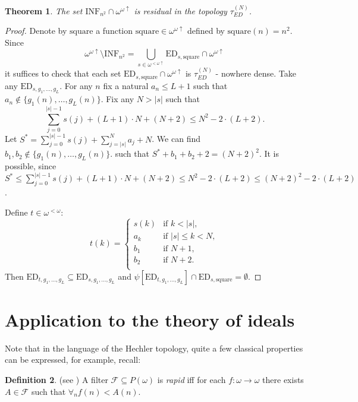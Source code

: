 \documentclass[12pt]{amsart}
\theoremstyle{plain}
\newtheorem{theorem}{Theorem}[section]
\theoremstyle{definition}
\newtheorem{definition}[theorem]{Definition}
\theoremstyle{remark}
\newcommand{\finbaire}{\omega^{<\omega}}
\newcommand{\finincrbaire}{\omega^{< \omega \uparrow}}
\newcommand{\incrbaire}{\omega^{\omega \uparrow}}
\newcommand{\calF}{\mathcal{F}}
\newcommand{\EventuallyDifferent}[2]{\mathrm{ED}_{#1,#2}}
\newcommand{\EventuallyDifferentNative}{\tau_{\mathit{ED}}^{(N)}}
\newcommand{\INFSquare}{\mathrm{INF}_{n^2}}
\newcommand{\squareFunction}{\mathrm{square}}
\begin{document}
 \begin{theorem}
  The set $\INFSquare\cap\incrbaire$ is residual
in the topology $\EventuallyDifferentNative$.
\end{theorem}

\begin{proof}
  Denote by $\squareFunction$ a function
  $\squareFunction \in \incrbaire$ defined by
  $\squareFunction(n) = n^2$.
  Since
  \[
    \incrbaire\setminus\INFSquare = \bigcup_{s \in \finincrbaire}
    \EventuallyDifferent{s}{\squareFunction} \cap \incrbaire
  \]
  it suffices to check that each set
  $\EventuallyDifferent{s}{\squareFunction} \cap \incrbaire$
  is $\EventuallyDifferentNative$ - nowhere dense.
  Take any $\EventuallyDifferent{s}{g_1,\ldots,g_L}$.
  For any $n$ fix a natural $a_n \leq L + 1$ such that
  $a_n \not\in \lbrace g_1(n), \ldots, g_L(n)\rbrace$.
  Fix any $N > |s|$ such that
  \[
\sum_{j = 0}^{|s| - 1} s(j) + (L + 1) \cdot N + (N + 2) \leq N^2 - 2 \cdot (L + 2).
\]
Let $S^* = \sum_{j = 0}^{|s| - 1} s(j) + \sum_{j = |s|}^{N} a_j + N$.
We can find $b_1, b_2 \not\in \lbrace g_1(n), \ldots, g_L(n)\rbrace$.
such that
$S^* + b_1 + b_2 + 2 = (N + 2)^2$.
It is possible, since
$S^* \leq \sum_{j = 0}^{|s| - 1} s(j) + (L + 1) \cdot N + (N + 2) \leq N^2 - 2 \cdot (L + 2)
\leq (N + 2)^2 - 2 \cdot (L + 2)$.

Define $t \in \finbaire$: 
  \[
  t(k)= \begin{cases}
    s(k)& \text{if } k < |s|,\\
    a_k & \text{if } |s| \leq k < N,\\
    b_1 & \text{if } N + 1,\\
    b_2 & \text{if } N + 2.\\    
    \end{cases}
   \]
   Then
   $\EventuallyDifferent{t}{g_1,\ldots,g_L} \subseteq \EventuallyDifferent{s}{g_1,\ldots,g_L}$
   and $\psi[\EventuallyDifferent{t}{g_1,\ldots,g_L}] \cap \EventuallyDifferent{s}{\squareFunction} = \emptyset$.
\end{proof}
\section{Application to the theory of ideals}

Note that in the language of the Hechler topology,
quite a few classical properties can be expressed, for example, recall:

\begin{definition} (see \cite{Mokobodzki19671968})
A filter $\calF \subseteq P(\omega)$ is {\it rapid}
iff for each $f \colon \omega\to\omega$
there exists $A \in \calF$ such that
$\forall_n f(n) < A(n)$.
\end{definition}
\end{document}
